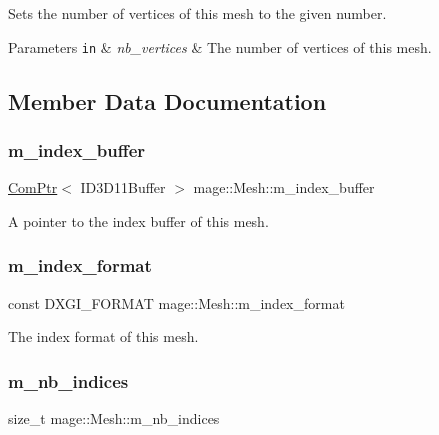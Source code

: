 Sets the number of vertices of this mesh to the given number.


\begin{DoxyParams}[1]{Parameters}
\mbox{\tt in}  & {\em nb\+\_\+vertices} & The number of vertices of this mesh. \\
\hline
\end{DoxyParams}


\subsection{Member Data Documentation}
\hypertarget{classmage_1_1_mesh_abe29363ebac77b284ca69532fd5b3373}{}\label{classmage_1_1_mesh_abe29363ebac77b284ca69532fd5b3373} 
\subsubsection{\texorpdfstring{m\+\_\+index\+\_\+buffer}{m\_index\_buffer}}
{\footnotesize\ttfamily \hyperlink{namespacemage_ae74f374780900893caa5555d1031fd79}{Com\+Ptr}$<$ I\+D3\+D11\+Buffer $>$ mage\+::\+Mesh\+::m\+\_\+index\+\_\+buffer\hspace{0.3cm}{\ttfamily [protected]}}

A pointer to the index buffer of this mesh. \hypertarget{classmage_1_1_mesh_a93dbb92d756948df3b08fc29426c6acf}{}\label{classmage_1_1_mesh_a93dbb92d756948df3b08fc29426c6acf} 
\subsubsection{\texorpdfstring{m\+\_\+index\+\_\+format}{m\_index\_format}}
{\footnotesize\ttfamily const D\+X\+G\+I\+\_\+\+F\+O\+R\+M\+AT mage\+::\+Mesh\+::m\+\_\+index\+\_\+format\hspace{0.3cm}{\ttfamily [private]}}

The index format of this mesh. \hypertarget{classmage_1_1_mesh_a5e3baa9e2b2e9b4ce795a456f76d87b2}{}\label{classmage_1_1_mesh_a5e3baa9e2b2e9b4ce795a456f76d87b2} 
\subsubsection{\texorpdfstring{m\+\_\+nb\+\_\+indices}{m\_nb\_indices}}
{\footnotesize\ttfamily size\+\_\+t mage\+::\+Mesh\+::m\+\_\+nb\+\_\+indices\hspace{0.3cm}{\ttfamily [private]}}

